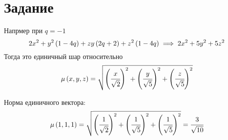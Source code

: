 \section{Задание}
Напрмер при $q = -1$
\begin{equation}
    2x^2+y^2\left( 1-4q \right) + zy\left( 2q+2 \right) + z^2\left( 1-4q \right) \implies
    2x^2+5y^2 + 5z^2
\end{equation}
Тогда это единичный шар относительно 
\begin{equation}
    \mu\left( x, y, z \right) 
    = \sqrt{\left( \cfrac{x}{\sqrt{2}} \right)^2 + \left( \cfrac{y}{\sqrt{5}} \right)^2 
    + \left( \cfrac{z}{\sqrt{5}} \right)^2}
\end{equation}


Норма единичного вектора:
\begin{equation}
    \mu\left( 1, 1, 1 \right) 
    = \sqrt{\left( \cfrac{1}{\sqrt{2}} \right)^2 + \left( \cfrac{1}{\sqrt{5}} \right)^2 
    + \left( \cfrac{1}{\sqrt{5}} \right)^2} = \cfrac{3}{\sqrt{10}}
\end{equation}



